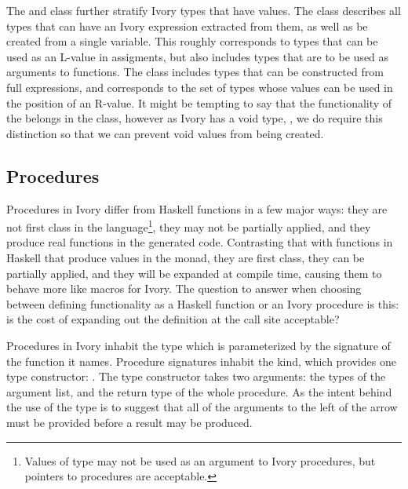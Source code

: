 The  and  class further stratify Ivory types that
have values.  The  class describes all types that can have an Ivory
expression extracted from them, as well as be created from a single variable.
This roughly corresponds to types that can be used as an L-value in assigments,
but also includes types that are to be used as arguments to functions.
The  class includes types that can be constructed from full
expressions, and corresponds to the set of types whose values can be used in the
position of an R-value.  It might be tempting to say that the functionality of
the  belongs in the  class, however as Ivory has a
void type, \cd{()}, we do require this distinction so that we can prevent void
values from being created.


\subsection{Procedures}
\label{sec:proc}

Procedures in Ivory differ from Haskell functions in a few major ways: they are
not first class in the language\footnote{Values of type  may not be used
as an argument to Ivory procedures, but pointers to procedures are acceptable.},
they may not be partially applied, and they produce real functions in the
generated code.  Contrasting that with functions in Haskell that produce values
in the  monad, they are first class, they can be partially applied,
and they will be expanded at compile time, causing them to behave more like
macros for Ivory.  The question to answer when choosing between defining
functionality as a Haskell function or an Ivory procedure is this: is the cost
of expanding out the definition at the call site acceptable?

Procedures in Ivory inhabit the  type which is parameterized by the
signature of the function it names.  Procedure signatures inhabit the 
kind, which provides one type constructor: \cd{:->}.  The \cd{:->} type
constructor takes two arguments: the types of the argument list, and the return
type of the whole procedure.  As the intent behind the use of the \cd{:->} type
is to suggest that all of the arguments to the left of the arrow must be
provided before a result may be produced.

